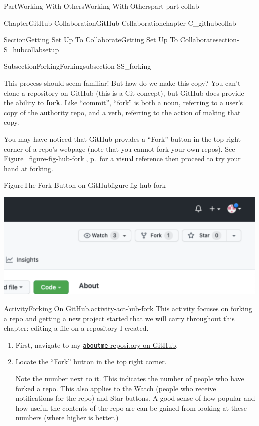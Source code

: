 \documentclass[twoside,10pt,]{book}
\newcommand{\xreffont}{\relax}
\newcommand{\mono}[1]{\texttt{#1}}
\newcommand{\terminology}[1]{\textbf{#1}}
\begin{document}
\begin{partptx}{Part}{Working With Others}{}{Working With Others}{}{}{part-part-collab}
\begin{chapterptx}{Chapter}{GitHub Collaboration}{}{GitHub Collaboration}{}{}{chapter-C_githubcollab}
\begin{sectionptx}{Section}{Getting Set Up To Collaborate}{}{Getting Set Up To Collaborate}{}{}{section-S_hubcollabsetup}
\begin{subsectionptx}{Subsection}{Forking}{}{Forking}{}{}{subsection-SS_forking}
\par
This process should seem familiar! But how do we make this copy? You can't clone a repository on GitHub (this is a Git concept), but GitHub does provide the ability to \terminology{fork}. Like ``commit'', ``fork'' is both a noun, referring to a user's copy of the authority repo, and a verb, referring to the action of making that copy.%
\par
You may have noticed that GitHub provides a ``Fork'' button in the top right corner of a repo's webpage (note that you cannot fork your own repos). See \hyperref[figure-fig-hub-fork]{Figure~{\xreffont\ref{figure-fig-hub-fork}}, p.\,\pageref{figure-fig-hub-fork}} for a visual reference then proceed to try your hand at forking.%
\begin{figureptx}{Figure}{The Fork Button on GitHub}{figure-fig-hub-fork}{}%
\begin{image}{0.1}{0.8}{0.1}{}%
\includegraphics[width=\linewidth]{external/hub_fork.pdf}
\end{image}%
\tcblower
\end{figureptx}%
\begin{activity}{Activity}{Forking On GitHub.}{activity-act-hub-fork}%
This activity focuses on forking a repo and getting a new project started that we will carry throughout this chapter: editing a file on a repository I created.%
\begin{enumerate}[font=\bfseries,label=(\alph*),ref=\alph*]%
\item{}First, navigate to my \href{https://github.com/ian-curtis/aboutme}{\mono{aboutme} repository on GitHub}\footnotemark{}.%
\item{}Locate the ``Fork'' button in the top right corner.%
\par
Note the number next to it. This indicates the number of people who have forked a repo. This also applies to the Watch (people who receive notifications for the repo) and Star buttons. A good sense of how popular and how useful the contents of the repo are can be gained from looking at these numbers (where higher is better.)%

\end{enumerate}
\end{activity}
\end{subsectionptx}
\end{sectionptx}
\end{chapterptx}
\end{partptx}
\end{document}
